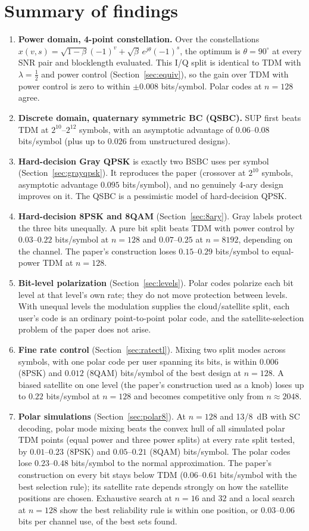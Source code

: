 \documentclass[11pt]{article}
\begin{document}
\section{Summary of findings}
\begin{enumerate}
\item \textbf{Power domain, 4-point constellation.} Over the constellations $x(v,s)=\sqrt{1-\beta}(-1)^v+\sqrt{\beta}\,e^{j\theta}(-1)^s$, the optimum is $\theta=90^\circ$ at every SNR pair and blocklength evaluated. This I/Q split is identical to TDM with $\lambda=\frac12$ and power control (Section~\ref{sec:equiv}), so the gain over TDM with power control is zero to within $\pm0.008$ bits/symbol. Polar codes at $n=128$ agree.
\item \textbf{Discrete domain, quaternary symmetric BC (QSBC).} SUP first beats TDM at $2^{10}$--$2^{12}$ symbols, with an asymptotic advantage of $0.06$--$0.08$ bits/symbol (plus up to $0.026$ from unstructured designs).
\item \textbf{Hard-decision Gray QPSK} is exactly two BSBC uses per symbol (Section~\ref{sec:grayqpsk}). It reproduces the paper (crossover at $2^{10}$ symbols, asymptotic advantage $0.095$ bits/symbol), and no genuinely 4-ary design improves on it. The QSBC is a pessimistic model of hard-decision QPSK.
\item \textbf{Hard-decision 8PSK and 8QAM} (Section~\ref{sec:8ary}). Gray labels protect the three bits unequally. A pure bit split beats TDM with power control by $0.03$--$0.22$ bits/symbol at $n=128$ and $0.07$--$0.25$ at $n=8192$, depending on the channel. The paper's construction loses $0.15$--$0.29$ bits/symbol to equal-power TDM at $n=128$.
\item \textbf{Bit-level polarization} (Section~\ref{sec:levels}). Polar codes polarize each bit level at that level's own rate; they do not move protection between levels. With unequal levels the modulation supplies the cloud/satellite split, each user's code is an ordinary point-to-point polar code, and the satellite-selection problem of the paper does not arise.
\item \textbf{Fine rate control} (Section~\ref{sec:ratectl}). Mixing two split modes across symbols, with one polar code per user spanning its bits, is within $0.006$ (8PSK) and $0.012$ (8QAM) bits/symbol of the best design at $n=128$. A biased satellite on one level (the paper's construction used as a knob) loses up to $0.22$ bits/symbol at $n=128$ and becomes competitive only from $n\approx2048$.
\item \textbf{Polar simulations} (Section~\ref{sec:polar8}). At $n=128$ and 13/8~dB with SC decoding, polar mode mixing beats the convex hull of all simulated polar TDM points (equal power and three power splits) at every rate split tested, by $0.01$--$0.23$ (8PSK) and $0.05$--$0.21$ (8QAM) bits/symbol. The polar codes lose $0.23$--$0.48$ bits/symbol to the normal approximation. The paper's construction on every bit stays below TDM ($0.06$--$0.61$ bits/symbol with the best selection rule); its satellite rate depends strongly on how the satellite positions are chosen. Exhaustive search at $n=16$ and $32$ and a local search at $n=128$ show the best reliability rule is within one position, or $0.03$--$0.06$ bits per channel use, of the best sets found.

\end{enumerate}
\end{document}
